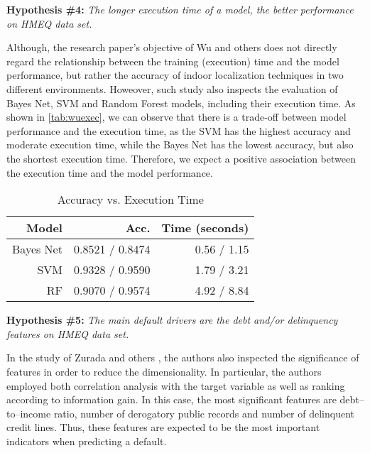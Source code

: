 \vspace{0.5cm}


\noindent \textbf{Hypothesis \#4:} \textit{The longer execution time of a model, the better performance on HMEQ data set.}

Although, the research paper's objective of Wu and others \citep{wu2018accurate} does not directly regard the relationship between the training (execution) time and the model performance, but rather the accuracy of indoor localization techniques in two different environments.
Howeover, such study also inspects the evaluation of Bayes Net, SVM and Random Forest models, including their execution time. As shown in \autoref{tab:wuexec}, we can observe that there is a trade-off between model performance and the execution time, as the SVM has the highest accuracy and moderate execution time, while the Bayes Net has the lowest accuracy, but also the shortest execution time.
Therefore, we expect a positive association between the execution time and the model performance.

\begin{table}[H]
    \small
    \setlength{\tabcolsep}{8pt}
    \renewcommand{\arraystretch}{1.3}
    \centering
    \caption[Accuracy vs. Execution Time \citep{wu2018accurate}]{Accuracy vs. Execution Time \citep{wu2018accurate}}\label{tab:wuexec}
    \begin{tabular}{r r r}
    \toprule
    \textbf{Model} & \textbf{Acc.} & \textbf{Time (seconds)} \\
    \midrule
    \hline
    Bayes Net & 0.8521 / 0.8474 & 0.56 / 1.15 \\
    SVM & 0.9328 / 0.9590 & 1.79 / 3.21 \\
    RF & 0.9070 / 0.9574 & 4.92 / 8.84 \\

    \hline
    \bottomrule
    \end{tabular}
    \vspace{0.35em}
    
    \vspace{-1em}
\end{table}

\vspace{0.5cm}

\noindent \textbf{Hypothesis \#5:} \textit{The main default drivers are the debt and/or delinquency features on HMEQ data set.}

In the study of Zurada and others \citep{zurada2014classification}, the authors also inspected the significance of features in order to reduce the dimensionality. In particular, the authors employed both correlation analysis with the target variable as well as ranking according to information gain.
In this case, the most significant features are debt--to--income ratio, number of derogatory public records and number of delinquent credit lines.
Thus, these features are expected to be the most important indicators when predicting a default.